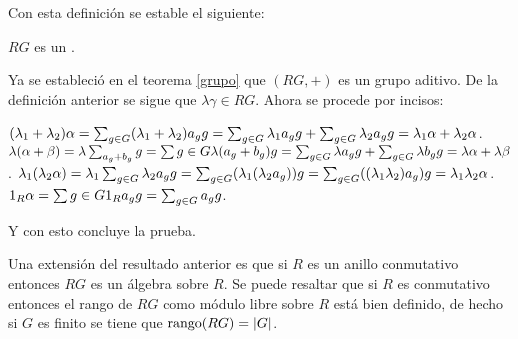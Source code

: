Con esta definición se estable el siguiente:
\begin{teorema}
$RG$ es un .
\end{teorema}
\begin{proof*}
Ya se estableció en el teorema \ref{grupo} que $(RG,+)$ es un grupo aditivo. De la definición anterior se sigue que $\lambda\gamma \in RG$. Ahora se procede por incisos: 
\begin{bulletList}
\newItem $(\lambda_1+\lambda_2)\alpha = \sum_{g \in G} (\lambda_1+\lambda_2)a_gg = \sum_{g \in G} \lambda_1 a_{g} g + \sum_{g \in G} \lambda_2 a_{g} g = \lambda_1\alpha + \lambda_2\alpha$.
\newItem $\lambda(\alpha + \beta) = \lambda\sum_{a_g+b_g}g = \sum{g \in G}\lambda(a_g+b_g)g = \sum_{g \in G} \lambda a_{g} g + \sum_{g \in G} \lambda b_{g} g = \lambda\alpha + \lambda\beta$.
\newItem  $\lambda_1(\lambda_2\alpha) = \lambda_1\sum_{g \in G} \lambda_2 a_{g} g = \sum_{g\in G}(\lambda_1(\lambda_2 a_g))g = \sum_{g\in G}((\lambda_1\lambda_2)a_g)g = \lambda_1\lambda_2\alpha$.
\newItem $1_R\alpha = \sum{g \in G}1_Ra_gg = \sum_{g \in G} a_{g} g$.
\end{bulletList}
Y con esto concluye la prueba. \qedhere
\end{proof*}
Una extensión del resultado anterior es que si $R$ es un anillo conmutativo entonces $RG$ es un álgebra sobre $R$. Se puede resaltar que si $R$ es conmutativo  entonces el rango de $RG$ como módulo libre sobre $R$ está bien definido, de hecho si $G$ es finito se tiene que $\operatorname{rango}(RG) = |G|$.

